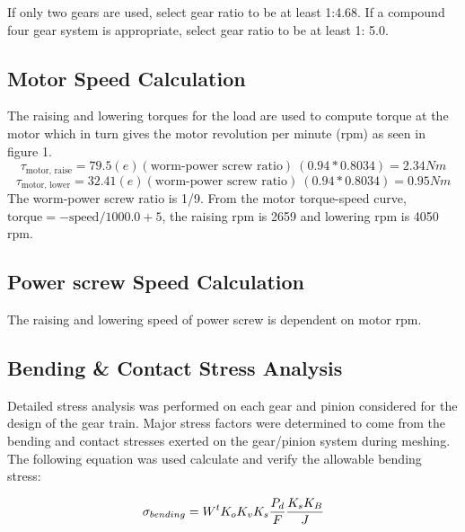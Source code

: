 \documentclass[letterpaper,12pt]{article}
\begin{document}
\noindent If only two gears are used, select gear ratio to be at least 1:4.68. If a compound four gear system is appropriate, select gear ratio to be at least 1: 5.0.

\subsection{Motor Speed Calculation}
The raising and lowering torques for the load are used to compute torque at the motor which in turn gives the motor revolution per minute (rpm) as seen in figure 1. 
$$\tau_{\text{motor, raise}} = 79.5 (e)(\text{worm-power screw ratio}) \ (0.94*0.8034) = 2.34 Nm$$
$$\tau_{\text{motor, lower}} = 32.41 (e)(\text{worm-power screw ratio}) \ (0.94*0.8034) = 0.95 Nm$$
The worm-power screw ratio is 1/9. From the motor torque-speed curve, $\text{torque} = -\text{speed}/1000.0+5$, the raising rpm is 2659 and lowering rpm is 4050 rpm. 

\subsection{Power screw Speed Calculation}
The raising and lowering speed of power screw is dependent on motor rpm. 

\subsection{Bending \& Contact Stress Analysis}

Detailed stress analysis was performed on each gear and pinion considered for the design of the gear train. Major stress factors were determined to come from the bending and contact stresses exerted on the gear/pinion system during meshing. The following equation was used calculate and verify the allowable bending stress:

\begin{equation}
\sigma_{bending} = W^t K_o K_v K_s \frac{P_d}{F}\frac{K_s K_B}{J} \\
\end{equation}
\end{document}
